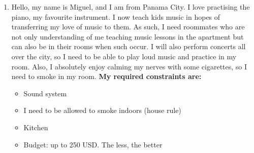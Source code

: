 \begin{enumerate}
\item Hello, my name is Miguel, and I am from Panama City. I love practising the piano, my favourite instrument. I now teach kids music in hopes of transferring my love of music to them. As such, I need roommates who are not only understanding of me teaching music lessons in the apartment but can also be in their rooms when such occur. I will also perform concerts all over the city, so I need to be able to play loud music and practice in my room. Also, I absolutely enjoy calming my nerves with some cigarettes, so I need to smoke in my room. \textbf{My required constraints are:}
\begin{itemize}
    \item Sound system
    \item I need to be allowed to smoke indoors (house rule)
    \item Kitchen
    \item Budget: up to 250 USD. The less, the better
\end{itemize}
\end{enumerate}


